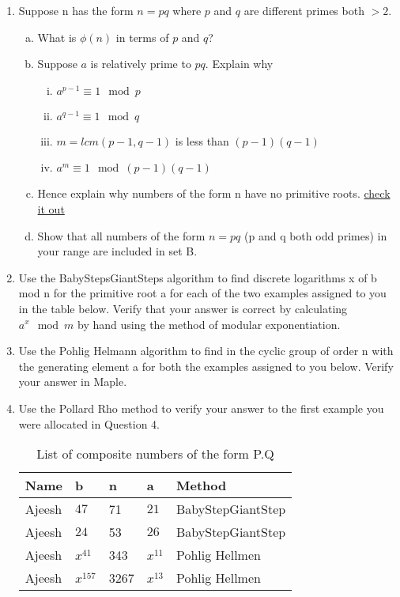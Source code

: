 \documentclass[11pt,a4paper]{article}
\begin{document}
\begin{enumerate}[1.]
		\item Suppose n has the form $n = pq$ where $p$ and $q$ are different primes both $> 2$. \\
	
		\begin{enumerate}[(a)]
			\item What is $\phi(n)$ in terms of $p$ and $q$?
			\item Suppose $a$ is relatively prime to $pq$.  Explain why 
			\begin{enumerate}[i.]
				\item $a^{p-1} \equiv 1\mod p$
				\item $a^{q-1} \equiv 1\mod q$
				\item $m = lcm(p-1, q-1)$ is less than $(p-1)(q-1)$
				\item $a^m \equiv 1 \mod (p-1)(q-1)$
			\end{enumerate}
			\item Hence explain why numbers of the form n have no primitive roots. \href{https://math.stackexchange.com/questions/162157/for-q-p-odd-primes-such-that-p-neq-q-there-is-not-primitive-root-modulo}{check it out}
			\item Show that all numbers of the form $n = pq$ (p and q both odd primes) in your range are included in set B.
		\end{enumerate}
		\item Use the BabyStepsGiantSteps algorithm to find discrete logarithms x of b mod n for the primitive root a for each of the two examples assigned to you in the table below. Verify that your answer is correct by calculating $a^x \mod m$ by hand using the method of modular exponentiation.
		\item Use the Pohlig Helmann algorithm to find in the cyclic group of order n with the generating element a for both the examples assigned to you below. Verify your answer in Maple.
		\item Use the Pollard Rho method to verify your answer to the first example you were allocated in Question 4. 
		
		\begin{table}[H]
			\begin{adjustbox}{scale=0.9,center}
				\begin{tabular}{ |p{2cm}|p{2cm}|p{2cm}|p{2cm}|p{4cm}| }
					\hline
					Name & b & n & a & Method \\
					\hline
					Ajeesh & $47$   & 71   & $21$   & BabyStepGiantStep \\
					Ajeesh & $24$   & 53   & $26$   & BabyStepGiantStep  \\
					Ajeesh & $x^{41}$ & 343  & $x^{11}$ & Pohlig Hellmen \\
					Ajeesh & $x^{157}$& 3267 & $x^{13}$ & Pohlig Hellmen  \\
					\hline
				\end{tabular}
			\end{adjustbox}
			\caption{List of composite numbers of the form P.Q}
			\label{table:composite-pq}
		\end{table}
		
	\end{enumerate}
	
\end{document}
